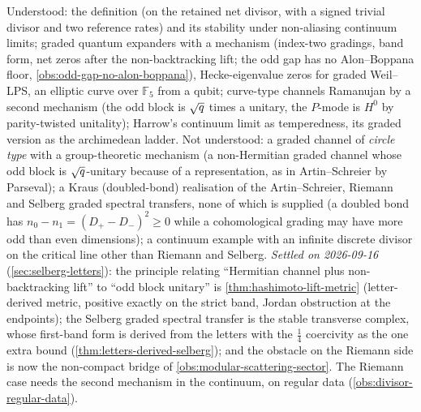 \begin{observation}[Status]
\label{obs:graded-ramanujan-status}
Understood: the definition (on the retained net divisor, with a signed trivial divisor and two
reference rates) and its stability under non-aliasing continuum limits; graded quantum expanders
with a mechanism (index-two gradings, band form, net zeros after the non-backtracking lift; the odd
gap has no Alon--Boppana floor, \cref{obs:odd-gap-no-alon-boppana}), Hecke-eigenvalue zeros for
graded Weil--LPS, an elliptic curve over $\mathbb F_5$ from a qubit; curve-type channels Ramanujan by a second mechanism
(the odd block is $\sqrt{q}$ times a unitary, the $P$-mode is $H^0$ by parity-twisted unitality); Harrow's continuum limit as temperedness, its graded version as the archimedean
ladder. Not understood: a graded channel of \emph{circle type} with a group-theoretic mechanism (a
non-Hermitian graded channel whose odd block is $\sqrt{q}$-unitary because of a representation, as
in Artin--Schreier by Parseval); a Kraus (doubled-bond) realisation of the Artin--Schreier, Riemann
and Selberg graded spectral transfers, none of which is supplied (a doubled bond has $n_0-n_1 =
(D_+-D_-)^2\ge0$ while a cohomological grading may have more odd than even dimensions); a continuum example with an infinite discrete divisor on
the critical line other than Riemann and Selberg. \emph{Settled on 2026-09-16}
(\cref{sec:selberg-letters}): the principle relating ``Hermitian channel plus non-backtracking
lift'' to ``odd block unitary'' is \cref{thm:hashimoto-lift-metric} (letter-derived metric,
positive exactly on the strict band, Jordan obstruction at the endpoints); the Selberg graded
spectral transfer is the stable transverse complex, whose first-band form is derived from the
letters with the $\tfrac14$ coercivity as the one extra bound
(\cref{thm:letters-derived-selberg}); and the obstacle on the Riemann side is now the
non-compact bridge of \cref{obs:modular-scattering-sector}. The Riemann case needs the
second mechanism in the continuum, on regular data (\cref{obs:divisor-regular-data}).
\end{observation}

